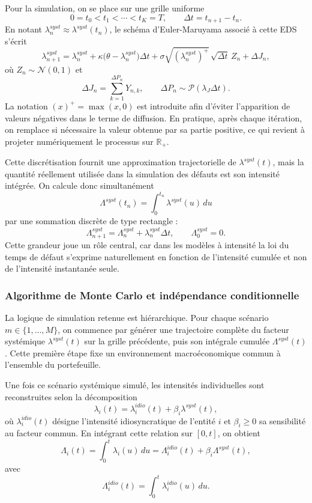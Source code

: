 Pour la simulation, on se place sur une grille uniforme
$$
0=t_0<t_1<\cdots<t_K=T,
\qquad
\Delta t=t_{n+1}-t_n.
$$
En notant $\lambda_n^{syst}\approx \lambda^{syst}(t_n)$, le schéma d'Euler-Maruyama associé à cette EDS s'écrit
$$
\lambda_{n+1}^{syst}
=
\lambda_n^{syst}
+
\kappa\bigl(\theta-\lambda_n^{syst}\bigr)\Delta t
+
\sigma\sqrt{(\lambda_n^{syst})^{+}}\,\sqrt{\Delta t}\,Z_n
+
\Delta J_n,
$$
où $Z_n \sim \mathcal{N}(0,1)$ et
$$
\Delta J_n=\sum_{k=1}^{\Delta P_n} Y_{n,k},
\qquad
\Delta P_n \sim \mathcal{P}(\lambda_J \Delta t).
$$
La notation $(x)^{+}=\max(x,0)$ est introduite afin d'éviter l'apparition de valeurs négatives dans le terme de diffusion. En pratique, après chaque itération, on remplace si nécessaire la valeur obtenue par sa partie positive, ce qui revient à projeter numériquement le processus sur $\mathbb{R}_{+}$.

Cette discrétisation fournit une approximation trajectorielle de $\lambda^{syst}(t)$, mais la quantité réellement utilisée dans la simulation des défauts est son intensité intégrée. On calcule donc simultanément
$$
\Lambda^{syst}(t_n)=\int_0^{t_n}\lambda^{syst}(u)\,du
$$
par une sommation discrète de type rectangle :
$$
\Lambda^{syst}_{n+1}
=
\Lambda^{syst}_{n}
+
\lambda_n^{syst}\Delta t,
\qquad
\Lambda^{syst}_0=0.
$$
Cette grandeur joue un rôle central, car dans les modèles à intensité la loi du temps de défaut s'exprime naturellement en fonction de l'intensité cumulée et non de l'intensité instantanée seule.

\subsubsection{Algorithme de Monte Carlo et indépendance conditionnelle}

La logique de simulation retenue est hiérarchique. Pour chaque scénario $m \in \{1,\dots,M\}$, on commence par générer une trajectoire complète du facteur systémique $\lambda^{syst}(t)$ sur la grille précédente, puis son intégrale cumulée $\Lambda^{syst}(t)$. Cette première étape fixe un environnement macroéconomique commun à l'ensemble du portefeuille.

Une fois ce scénario systémique simulé, les intensités individuelles sont reconstruites selon la décomposition
$$
\lambda_i(t)=\lambda_i^{idio}(t)+\beta_i\lambda^{syst}(t),
$$
où $\lambda_i^{idio}(t)$ désigne l'intensité idiosyncratique de l'entité $i$ et $\beta_i \geq 0$ sa sensibilité au facteur commun. En intégrant cette relation sur $[0,t]$, on obtient
$$
\Lambda_i(t)=\int_0^t \lambda_i(u)\,du
=
\Lambda_i^{idio}(t)+\beta_i\Lambda^{syst}(t),
$$
avec
$$
\Lambda_i^{idio}(t)=\int_0^t \lambda_i^{idio}(u)\,du.
$$

